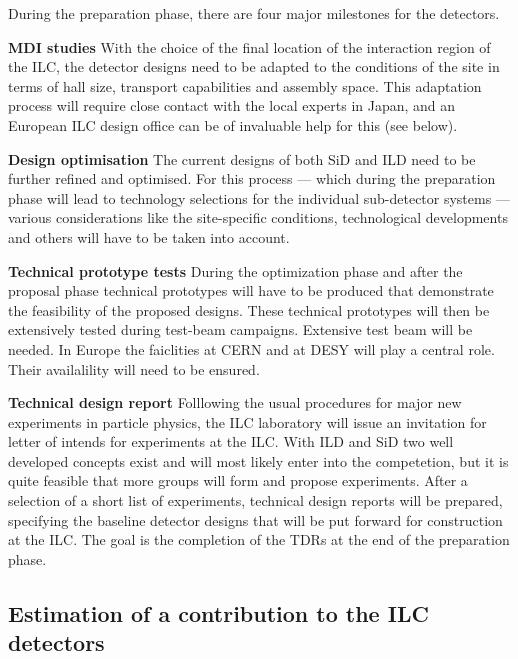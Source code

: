 \documentclass[%
 reprint,
 amsmath,amssymb,
 aps,
]{revtex4-1}
\begin{document}
During the preparation phase, there are four major milestones for the
detectors.
\begin{description}
\item{\bfseries MDI studies}
With the choice of the final location of the interaction region of the
ILC, the detector designs need to be adapted to the
conditions of the site in terms of hall size, transport capabilities and
assembly space. This adaptation process
will require close contact with the local experts in Japan,
and an European ILC design office can be of invaluable help for this
(see below).
\item{\bfseries Design optimisation}
The current designs of both SiD and ILD need to be further refined and
optimised. For this process --- which during the
preparation phase will lead to technology selections for the individual
sub-detector systems --- various considerations like
the site-specific conditions, technological developments and others will
have to be taken into account. 
\item{\bfseries Technical prototype tests}
During the optimization phase and after the proposal phase technical prototypes will
have to be produced that demonstrate the feasibility of the proposed
designs.
These technical prototypes will then be extensively tested during
test-beam campaigns. Extensive test beam will be needed. In Europe the faiclities at CERN and at DESY will play a central role. Their availalility will need to be ensured. 

\item{\bfseries Technical design report}
Folllowing the usual procedures for major new experiments in  particle physics, the ILC laboratory will issue an invitation for letter of intends for experiments at the ILC. With ILD and SiD two well developed concepts exist and will most likely enter into the competetion, but it is quite feasible that more groups will form and propose experiments. After a selection of a short list of experiments, technical design reports will be prepared, specifying the
baseline detector designs that will be put forward for construction at
the ILC. The goal
is the completion of the TDRs at the end of the preparation phase.
\end{description}

\subsection{\label{Section:constructionmodel:ILCDet} Estimation of a
contribution to the ILC detectors}
\end{document}
